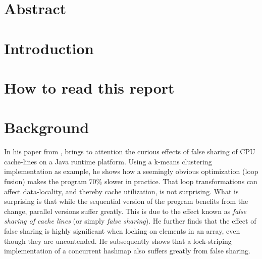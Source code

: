 \section{Abstract}
\section{Introduction}
\section{How to read this report}

\section{Background}
In his paper \cite{mystery} from \citeyear{mystery}, \citeauthor{mystery} brings to attention the curious effects of
false sharing of CPU cache-lines on a Java runtime platform. Using a k-means
clustering implementation as example, he shows how a seemingly obvious
optimization (loop fusion) makes the program 70\% slower in practice. That loop
transformations can affect data-locality,
and thereby cache utilization, is not surprising. What is surprising is that
while the sequential version of the program benefits from the change, parallel
versions suffer greatly. This is due to the effect known as \textit{false
sharing of cache lines} (or simply \textit{false sharing}). He further finds that
the effect of false sharing is highly significant when locking on elements in an
array, even though they are uncontended. He subsequently shows that a
lock-striping implementation of a concurrent hashmap also suffers greatly from
false sharing.

